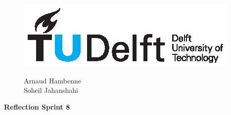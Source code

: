 \documentclass[11pt]{article}
\begin{document}
\thispagestyle{fancy}
\begin{figure}
    \begin{minipage}[H]{0.33\textwidth}
		\vspace{0.3cm}
		\includegraphics[scale=0.8]{img/TUDelftLogo.eps}
	\end{minipage}
	\begin{minipage}[H]{0.34\textwidth}
		\begin{center}
			\selectfont \textcolor{blue}{}
		\end{center}
		
	
	\end{minipage}
	\begin{minipage}[H]{0.33\textwidth}
			\begin{flushright}

				\small{Arnaud Hambenne }\\
				\small{Soheil Jahanshahi }\\
				

			\end{flushright}
			
	\end{minipage}
\end{figure}


\begin{minipage}[H]{\textwidth}
\vspace{0.3cm}
		\begin{center}
		
		\vspace{0.3cm}
			\Large{\selectfont \textbf{Reflection Sprint 8}}\\
		\vspace{0.3cm}	
		
		\vspace{0.7cm}	
		\end{center}
	\end{minipage}
\end{document}
